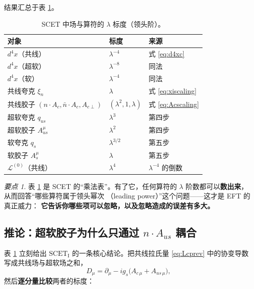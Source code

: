 \documentclass[UTF8,a4paper,11pt]{ctexart}
\theoremstyle{definition}
\theoremstyle{remark}
\newtheorem{keypoint}{要点}[section]
\theoremstyle{plain}
\newcommand{\SCETI}{\text{SCET}_{\mathrm{I}}}
\newcommand{\en}[1]{\textsf{#1}}   %
\begin{document}
结果汇总于表 \ref{tab:fields}。

\begin{table}[htbp]
\centering
\caption{SCET 中场与算符的 $\lambda$ 标度（领头阶）。}
\label{tab:fields}
\begin{tabular}{@{}lll@{}}
\toprule
对象 & 标度 & 来源 \\
\midrule
$d^4x$（共线）                  & $\lambda^{-4}$ & 式 \eqref{eq:d4xc} \\
$d^4x$（超软）                  & $\lambda^{-8}$ & 同法 \\
$d^4x$（软）                    & $\lambda^{-4}$ & 同法 \\
共线夸克 $\xi_n$                & $\lambda$      & 式 \eqref{eq:xiscaling} \\
共线胶子 $(n\!\cdot\!A_c,\bar n\!\cdot\!A_c,A_{c\perp})$
                                & $(\lambda^2,1,\lambda)$ & 式 \eqref{eq:Acscaling} \\
超软夸克 $q_{us}$               & $\lambda^3$    & 第四步 \\
超软胶子 $A_{us}^\mu$           & $\lambda^2$    & 第四步 \\
软夸克 $q_{s}$                  & $\lambda^{3/2}$& 第五步 \\
软胶子 $A_{s}^\mu$              & $\lambda$      & 第五步 \\
$\mathcal L^{(0)}$（共线）      & $\lambda^{4}$  & $\lambda^{-4}$ 的倒数 \\
\bottomrule
\end{tabular}
\end{table}

\begin{keypoint}
表 \ref{tab:fields} 是 SCET 的“乘法表”。有了它，任何算符的
$\lambda$ 阶数都可以\textbf{数出来}，从而回答“哪些算符属于领头幂次
（\en{leading power}）”这个问题——这才是 EFT 的真正威力：
\textbf{它告诉你哪些项可以忽略，以及忽略造成的误差有多大。}
\end{keypoint}

\subsection{推论：超软胶子为什么只通过 $n\cdot A_{us}$ 耦合}
\label{subsec:usoftcoupling}

表 \ref{tab:fields} 立刻给出 $\SCETI$ 的一条核心结论。把共线拉氏量
\eqref{eq:Lcprev} 中的协变导数写成共线场与超软场之和，
\begin{equation}
  D_\mu = \partial_\mu - i g_s\big(A_{c\,\mu}+A_{us\,\mu}\big),
\end{equation}
然后\textbf{逐分量比较}两者的标度：
\end{document}
